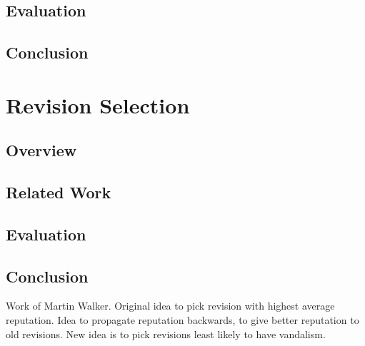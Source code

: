     \section{Evaluation}
    \section{Conclusion}

\chapter{Revision Selection}
    \section{Overview}
    \section{Related Work}
    \section{Evaluation}
    \section{Conclusion}

    Work of Martin Walker.
    Original idea to pick revision with highest average reputation.
    Idea to propagate reputation backwards, to give better reputation
    to old revisions.
    New idea is to pick revisions least likely to have vandalism.



